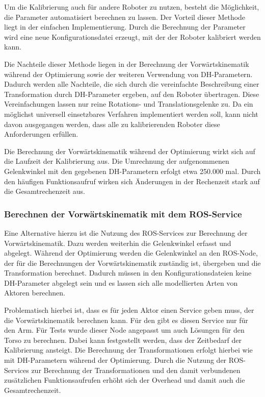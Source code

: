 \label{ssub:Berechnung der dh-par}

Um die Kalibrierung auch für andere Roboter zu nutzen,
besteht die Möglichkeit, die Parameter automatisiert berechnen zu lassen. Der Vorteil
dieser Methode liegt in der einfachen Implementierung. Durch die Berechnung der Parameter 
wird eine neue Konfigurationsdatei erzeugt, mit der der Roboter kalibriert werden kann.

Die Nachteile dieser Methode liegen in der Berechnung der Vorwärtskinematik während der
Optimierung sowie der weiteren Verwendung von \ac{DH-Parameter}n. Dadurch 
werden alle Nachteile, die sich durch die vereinfachte Beschreibung einer 
Transformation durch \ac{DH-Parameter} ergeben, auf den Roboter übertragen.
Diese Vereinfachungen lassen nur reine Rotations- und Translationsgelenke zu.
Da ein möglichst universell einsetzbares Verfahren implementiert werden soll, 
kann nicht davon ausgegangen werden, dass alle zu kalibrierenden Roboter diese 
Anforderungen erfüllen. 

Die Berechnung der Vorwärtskinematik während der Optimierung wirkt sich auf die 
Laufzeit der Kalibrierung aus. Die Umrechnung der aufgenommenen Gelenkwinkel mit 
den gegebenen \ac{DH-Parameter}n erfolgt etwa 250.000 mal. Durch den häufigen 
Funktionsaufruf wirken sich Änderungen in der Rechenzeit stark auf die 
Gesamtrechenzeit aus.

\subsubsection{Berechnen der Vorwärtskinematik mit dem ROS-Service} %

\label{ssub:Berechnen der Vorwärtskinematik mit dem ROS-Service}

Eine Alternative hierzu ist die Nutzung des ROS-Services zur Berechnung der Vorwärtskinematik.
Dazu werden weiterhin die Gelenkwinkel erfasst und abgelegt. Während der Optimierung werden
die Gelenkwinkel an den ROS-Node, der für die Berechnungen der Vorwärtskinematik zuständig ist, 
übergeben und die Transformation berechnet. Dadurch müssen in den Konfigurationsdateien keine
\ac{DH-Parameter} abgelegt sein und es lassen sich alle modellierten Arten von Aktoren berechnen.

Problematisch hierbei ist, dass es für jeden Aktor einen Service geben muss, der die 
Vorwärtskinematik berechnen kann. Für den \cob gibt es diesen Service nur für den Arm.
Für Tests wurde dieser Node angepasst um auch Lösungen für den Torso zu berechnen.
Dabei kann festgestellt werden, dass der Zeitbedarf der Kalibrierung ansteigt.
Die Berechnung der Transformationen erfolgt hierbei wie mit \ac{DH-Parameter}n
während der Optimierung. Durch die Nutzung der \ac{ROS}-Services zur Berechnung 
der Transformationen und den damit verbundenen zusätzlichen Funktionsaufrufen 
erhöht sich der Overhead und damit auch die Gesamtrechenzeit. 


